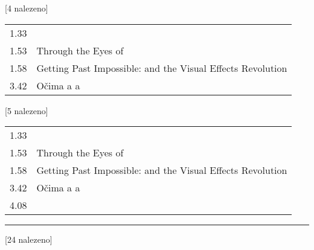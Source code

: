 \setlength{\tabcolsep}{1em}

\begin{table}[ht!]
\begin{tt}
\noindent
\begin{minipage}[t]{.5\textwidth}\vspace{0pt}
 [4 nalezeno]\vspace{5pt}

\begin{tabulary}{1.1\textwidth}{LL}
1.33 &   \\
1.53 & Through the Eyes of   \\
1.58 & Getting Past Impossible:   and the Visual Effects Revolution \\
3.42 & Očima a a \\
\end{tabulary}
\end{minipage}
\begin{minipage}[t]{.5\textwidth}\vspace{0pt}
 [5 nalezeno]\vspace{5pt}

\begin{tabulary}{1.1\textwidth}{LL}
1.33 &   \\
1.53 & Through the Eyes of   \\
1.58 & Getting Past Impossible:   and the Visual Effects Revolution \\
3.42 & Očima a a \\
4.08 &   \\
\end{tabulary}
\end{minipage}

\mbox{}\vspace{5pt}
\hrule
\mbox{}

\noindent
\begin{minipage}[t]{.5\textwidth}\vspace{0pt}
 [24 nalezeno]\vspace{5pt}


\end{minipage}
\end{tt}
\end{table}
